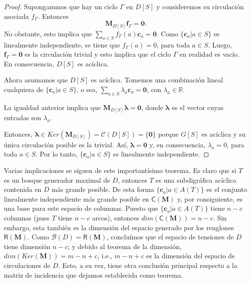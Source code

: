 \begin{proof}
Supongammos que hay un ciclo $\Gamma$ en $D[S]$ y consideremos su circulación asociada $f_{\Gamma}$. Entonces $$\mathbf{M}_{D[S]}\mathbf{f}_{\Gamma}= \mathbf{0}.$$ No obstante, esto implica que $\sum_{a \in S} f_{\Gamma}(a)\mathbf{c}_{a} = \mathbf{0}$. Como $\{\mathbf{c}_{a} | a \in S\}$ es linealmente independiente, se tiene que $f_{\Gamma}(a) = 0$, para toda $a \in S$. Luego, $\mathbf{f}_{\Gamma} = \mathbf{0}$ es la circulación trivial y esto implica que el ciclo $\Gamma$ en realidad es vacío. En consecuencia, $D[S]$ es acíclica.

Ahora asumamos que $D[S]$ es acíclica. Tomemos una combinación lineal cualquiera de $\{\mathbf{c}_{a} | a \in S\}$, o sea, $\sum_{a \in S} \lambda_{a} \mathbf{c}_{a} = \mathbf{0}$, con $\lambda_{a} \in \mathbb{R}$.

La igualdad anterior implica que $\mathbf{M}_{D[S]}\boldsymbol{\lambda} = \mathbf{0}$, donde $\boldsymbol{\lambda}$ es el vector cuyas entradas son $\lambda_{a}$.

Entonces, $\boldsymbol{\lambda} \in Ker(\mathbf{M}_{D[S]}) = \mathcal{C}(D[S]) = \{\mathbf{0}\}$ porque $G[S]$ es acíclica y su única circulación posible es la trivial. Así, $\boldsymbol{\lambda} = \mathbf{0}$ y, en consecuencia, $\lambda_{a} = 0$, para toda $a \in S$. Por lo tanto, $\{\mathbf{c}_{a} | a \in S\}$ es linealmente independiente.

\end{proof}
 
 Varias implicaciones se siguen de este importantísimo teorema. Es claro que si $T$ es un bosque generador maximal de $D$, entonces $T$ es una subdigráfica acíclica contenida en $D$ más grande posible. De esta forma $\{\mathbf{c}_{a} | a \in A(T)\}$ es el conjunto linealmente independiente más grande posible en $\mathsf{C}(\mathbf{M})$ y, por consiguiente, es una base para este espacio de columnas. Puesto que $\{\mathbf{c}_{a} | a \in A(T)\}$ tiene $n-c$ columnas (pues $T$ tiene $n-c$ arcos), entonces $dim(\mathsf{C}(\mathbf{M})) = n- c$. Sin embargo, esta también es la dimensión del espacio generado por los renglones $\mathsf{R}(\mathbf{M})$. Como $\mathcal{B}(D) = \mathsf{R}(\mathbf{M})$, concluímos que el espacio de tensiones de $D$ tiene dimensión $n - c$; y debido al teorema de la dimensión, $dim(Ker(\mathbf{M}))= m - n + c$, i.e., $m - n + c$ es la dimensión del espacio de circulaciones de $D$. Esto, a su vez, tiene otra conclusión principal respecto a la matriz de incidencia que dejamos establecida como teorema. 
 
